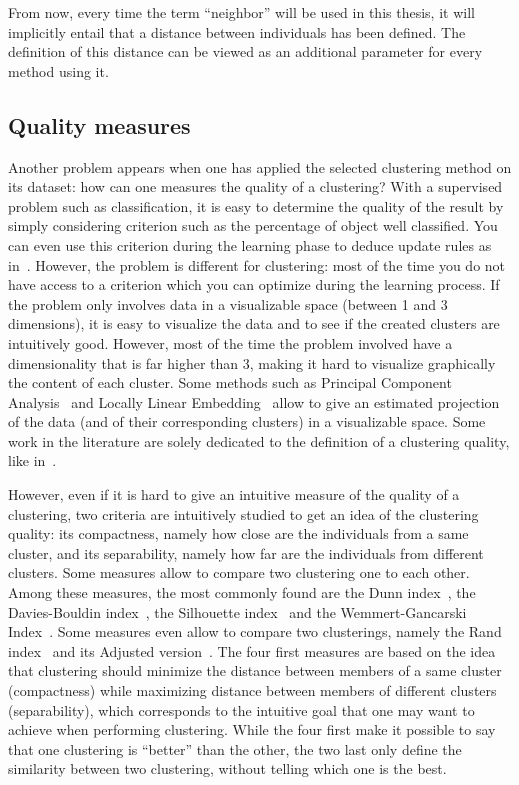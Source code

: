     From now, every time the term ``neighbor'' will be used in this thesis, it will implicitly entail that a distance between individuals has been defined. The definition of this distance can be viewed as an additional parameter for every method using it.

    \subsection{Quality measures}
\label{sec:quality_measures}
    Another problem appears when one has applied the selected clustering method on its dataset: how can one measures the quality of a clustering? With a supervised problem such as classification, it is easy to determine the quality of the result by simply considering criterion such as the percentage of object well classified. You can even use this criterion during the learning phase to deduce update rules as in~\cite{vincent2010stacked}. However, the problem is different for clustering: most of the time you do not have access to a criterion which you can optimize during the learning process. If the problem only involves data in a visualizable space (between 1 and 3 dimensions), it is easy to visualize the data and to see if the created clusters are intuitively good. However, most of the time the problem involved have a dimensionality that is far higher than 3, making it hard to visualize graphically the content of each cluster. Some methods such as Principal Component Analysis~\cite{wold1987principal} and Locally Linear Embedding~\cite{roweis2000nonlinear} allow to give an estimated projection of the data (and of their corresponding clusters) in a visualizable space. Some work in the literature are solely dedicated to the definition of a clustering quality, like in~\cite{ben2009measures}.

However, even if it is hard to give an intuitive measure of the quality of a 
clustering, two criteria are intuitively studied to get an idea of the 
clustering quality: its compactness, namely how close are the individuals from a 
same cluster, and its separability, namely how far are the individuals from 
different clusters. Some measures allow to compare two clustering one to each 
other. Among these measures, the most commonly found are the Dunn 
index~\cite{dunn1973fuzzy}, the Davies-Bouldin index~\cite{davies1979cluster}, 
the Silhouette index~\cite{rousseeuw1987silhouettes} and the Wemmert-Gancarski 
Index~\cite{wemmert2000classification}. Some measures even allow to compare two 
clusterings, namely the Rand index~\cite{rand1971objective} and its Adjusted 
version~\cite{hubert1985comparing}. The four first measures are based on the 
idea that clustering should minimize the distance between members of a same 
cluster (compactness) while maximizing distance between members of different 
clusters (separability), which corresponds to the intuitive goal that one may 
want to achieve when performing clustering.  While the four first make it 
possible to say that one clustering is ``better'' than the other, the two last 
only define the similarity between two clustering, without telling which one is 
the best.

